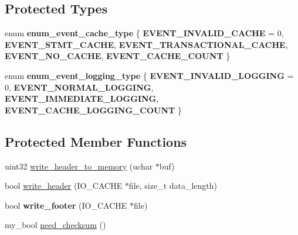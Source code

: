 \subsection*{Protected Types}
\begin{DoxyCompactItemize}
\item 
\mbox{\label{classLog__event_a4179a22317b9fc71dfaf452505325876}} 
enum {\bfseries enum\+\_\+event\+\_\+cache\+\_\+type} \{ \newline
{\bfseries E\+V\+E\+N\+T\+\_\+\+I\+N\+V\+A\+L\+I\+D\+\_\+\+C\+A\+C\+HE} = 0, 
{\bfseries E\+V\+E\+N\+T\+\_\+\+S\+T\+M\+T\+\_\+\+C\+A\+C\+HE}, 
{\bfseries E\+V\+E\+N\+T\+\_\+\+T\+R\+A\+N\+S\+A\+C\+T\+I\+O\+N\+A\+L\+\_\+\+C\+A\+C\+HE}, 
{\bfseries E\+V\+E\+N\+T\+\_\+\+N\+O\+\_\+\+C\+A\+C\+HE}, 
\newline
{\bfseries E\+V\+E\+N\+T\+\_\+\+C\+A\+C\+H\+E\+\_\+\+C\+O\+U\+NT}
 \}
\item 
\mbox{\label{classLog__event_ac79c873eedf144ef04f9f61cf35a131f}} 
enum {\bfseries enum\+\_\+event\+\_\+logging\+\_\+type} \{ {\bfseries E\+V\+E\+N\+T\+\_\+\+I\+N\+V\+A\+L\+I\+D\+\_\+\+L\+O\+G\+G\+I\+NG} = 0, 
{\bfseries E\+V\+E\+N\+T\+\_\+\+N\+O\+R\+M\+A\+L\+\_\+\+L\+O\+G\+G\+I\+NG}, 
{\bfseries E\+V\+E\+N\+T\+\_\+\+I\+M\+M\+E\+D\+I\+A\+T\+E\+\_\+\+L\+O\+G\+G\+I\+NG}, 
{\bfseries E\+V\+E\+N\+T\+\_\+\+C\+A\+C\+H\+E\+\_\+\+L\+O\+G\+G\+I\+N\+G\+\_\+\+C\+O\+U\+NT}
 \}
\end{DoxyCompactItemize}
\subsection*{Protected Member Functions}
\begin{DoxyCompactItemize}
\item 
uint32 \mbox{\hyperlink{classLog__event_a24fdaf3da904d7f1e2723d8a853f8dd8}{write\+\_\+header\+\_\+to\+\_\+memory}} (uchar $\ast$buf)
\item 
bool \mbox{\hyperlink{classLog__event_a60f9564629374ebacd3071a13df325a5}{write\+\_\+header}} (I\+O\+\_\+\+C\+A\+C\+HE $\ast$file, size\+\_\+t data\+\_\+length)
\item 
\mbox{\label{classLog__event_a98c2edec6e4a1247347be26b7d8a1fee}} 
bool {\bfseries write\+\_\+footer} (I\+O\+\_\+\+C\+A\+C\+HE $\ast$file)
\item 
my\+\_\+bool \mbox{\hyperlink{classLog__event_aacff30f48b3ce70749cd22cb6576cd52}{need\+\_\+checksum}} ()
\end{DoxyCompactItemize}

